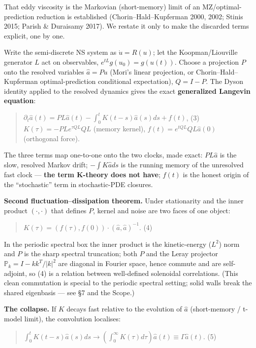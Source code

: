 \documentclass[11pt]{article}
\begin{document}
That eddy viscosity is the Markovian (short-memory) limit of an MZ/optimal-prediction reduction is established (Chorin–Hald–Kupferman 2000, 2002; Stinis 2015; Parish \& Duraisamy 2017). We restate it only to make the discarded terms explicit, one by one.


Write the semi-discrete NS system as $\dot{u}=R(u)$; let the Koopman/Liouville generator $L$ act on observables, $e^{tL}g(u_{0})=g(u(t))$. Choose a projection $P$ onto the resolved variables $\hat{a}=Pu$ (Mori's linear projection, or Chorin–Hald–Kupferman optimal-prediction conditional expectation), $Q=I-P$. The Dyson identity applied to the resolved dynamics gives the exact \textbf{generalized Langevin equation}:


\begin{quote}
$\partial _{t}\hat{a}(t) = PL\hat{a}(t) - \int _{0}^{t} K(t-s) \hat{a}(s) ds + f(t)$, (3) $K(\tau ) = -P L e^{\tau QL} Q L$ (memory kernel), $f(t)=e^{tQL}QL\hat{a}(0)$ (orthogonal force).
\end{quote}


The three terms map one-to-one onto the two clocks, made exact: $PL\hat{a}$ is the slow, resolved Markov drift; $-\int K \hat{a} ds$ is the running memory of the unresolved fast clock — \textbf{the term K-theory does not have}; $f(t)$ is the honest origin of the ``stochastic'' term in stochastic-PDE closures.


\textbf{Second fluctuation–dissipation theorem.} Under stationarity and the inner product $(\cdot ,\cdot )$ that defines $P$, kernel and noise are two faces of one object:


\begin{quote}
$K(\tau ) = (f(\tau ),f(0))\cdot (\hat{a},\hat{a})^{-1}$. (4)
\end{quote}


In the periodic spectral box the inner product is the kinetic-energy ($L^{2}$) norm and $P$ is the sharp spectral truncation; both $P$ and the Leray projector $\mathbb{P}_{k}=I-kk^{T}/|k|^{2}$ are diagonal in Fourier space, hence commute and are self-adjoint, so (4) is a relation between well-defined solenoidal correlations. (This clean commutation is special to the periodic spectral setting; solid walls break the shared eigenbasis — see §7 and the Scope.)


\textbf{The collapse.} If $K$ decays fast relative to the evolution of $\hat{a}$ (short-memory / t-model limit), the convolution localises:


\begin{quote}
$\int _{0}^{t} K(t-s) \hat{a}(s) ds \longrightarrow  (\int _{0}^\infty  K(\tau )d\tau ) \hat{a}(t) \equiv  \Gamma  \hat{a}(t)$. (5)
\end{quote}
\end{document}
